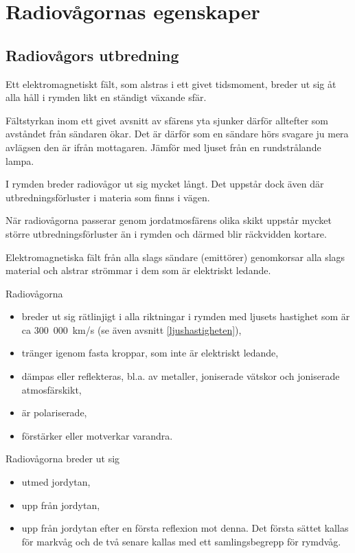 \section{Radiovågornas egenskaper}
\label{radiovågornasegenskaper}

\subsection{Radiovågors utbredning}

Ett elektromagnetiskt fält, som alstras i ett givet tidsmoment, breder
ut sig åt alla håll i rymden likt en ständigt växande sfär.

Fältstyrkan inom ett givet avsnitt av sfärens yta sjunker därför
alltefter som avståndet från sändaren ökar. Det är därför som en
sändare hörs svagare ju mera avlägsen den är ifrån mottagaren. Jämför
med ljuset från en rundstrålande lampa.

I rymden breder radiovågor ut sig mycket långt. Det uppstår dock även
där utbredningsförluster i materia som finns i vägen.

När radiovågorna passerar genom jordatmosfärens olika skikt uppstår
mycket större utbredningsförluster än i rymden och därmed blir
räckvidden kortare.

Elektromagnetiska fält från alla slags sändare (emittörer) genomkorsar
alla slags material och alstrar strömmar i dem som är elektriskt
ledande.

Radiovågorna
\begin{itemize}
\item breder ut sig rätlinjigt i alla riktningar i rymden med ljusets
  hastighet som är ca 300~000~km/s (se även avsnitt \ref{ljushastigheten}),
\item tränger igenom fasta kroppar, som inte är elektriskt ledande,
\item dämpas eller reflekteras, bl.a. av metaller, joniserade vätskor
  och joniserade atmosfärskikt,
\item är polariserade,
\item förstärker eller motverkar varandra.
\end{itemize}
Radiovågorna breder ut sig
\begin{itemize}
\item utmed jordytan,
\item upp från jordytan,
\item upp från jordytan efter en första reflexion mot denna.  Det
  första sättet kallas för markvåg och de två senare kallas med ett
  samlingsbegrepp för rymdvåg.
\end{itemize}

